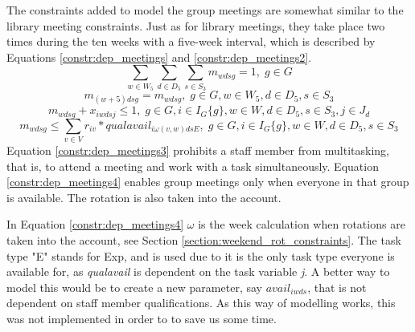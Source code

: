 The constraints added to model the group meetings are somewhat similar to the library meeting constraints. Just as for library meetings, they take place two times during the ten weeks with a five-week interval, which is described by Equations \ref{constr:dep_meetings} and \ref{constr:dep_meetings2}.
\begin{equation} \label{constr:dep_meetings}
\sum_{w \in W_5}\sum_{d \in D_5}\sum_{s \in S_3} m_{wdsg} = 1, \; g \in G
\end{equation}
\begin{equation} \label{constr:dep_meetings2}
m_{(w+5)dsg} = m_{wdsg}, \;   g \in G, w \in W_5, d \in D_5, s \in S_3
\end{equation}
\begin{equation} \label{constr:dep_meetings3}
m_{wdsg} + x_{iwdsj} \leq 1, \;   g \in G, i \in I_{G}\{g\}, w \in W, d \in D_5, s \in S_3, j \in J_d
\end{equation}
\begin{equation} \label{constr:dep_meetings4}
m_{wdsg} \leq \sum_{v \in V} r_{iv}*qualavail_{i\omega(v,w)dsE}, \;   g \in G, i \in I_{G}\{g\}, w \in W, d \in D_5, s \in S_3
\end{equation}
Equation \ref{constr:dep_meetings3} prohibits a staff member from multitasking, that is, to attend a meeting and work with a task simultaneously. Equation \ref{constr:dep_meetings4} enables group meetings only when everyone in that group is available. The rotation is also taken into the account.

In Equation \ref{constr:dep_meetings4} $\omega$ is the week calculation when rotations are taken into the account, see Section \ref{section:weekend_rot_constraints}. The task type "E" stands for Exp, and is used due to it is the only task type everyone is available for, as \textit{qualavail} is dependent on the task variable \textit{j}. A better way to model this would be to create a new parameter, say $avail_{iwds}$, that is not dependent on staff member qualifications. As this way of modelling works, this was not implemented in order to to save us some time.

